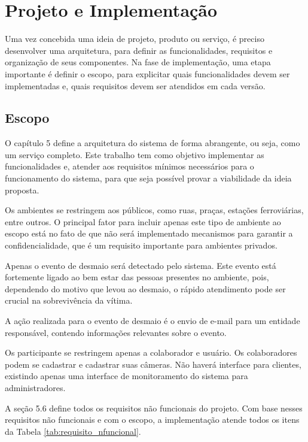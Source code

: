 \documentclass[]{politex}
\begin{document}
\chapter{Projeto e Implementação}
Uma vez concebida uma ideia de projeto, produto ou serviço, é preciso desenvolver uma arquitetura, para definir as funcionalidades, requisitos e organização de seus componentes. Na fase de implementação, uma etapa importante é definir o escopo, para explicitar quais funcionalidades devem ser implementadas e, quais requisitos devem ser atendidos em cada versão.

\section{Escopo}
O capítulo 5 define a arquitetura do sistema de forma abrangente, ou seja, como um serviço completo. Este trabalho tem como objetivo implementar as funcionalidades e, atender aos requisitos mínimos necessários para o funcionamento do sistema, para que seja possível provar a viabilidade da ideia proposta.

Os ambientes se restringem aos públicos, como ruas, praças, estações ferroviárias, entre outros. O principal fator para incluir apenas este tipo de ambiente ao escopo está no fato de que não será implementado mecanismos para garantir a confidencialidade, que é um requisito importante para ambientes privados.

Apenas o evento de desmaio será detectado pelo sistema. Este evento está fortemente ligado ao bem estar das pessoas presentes no ambiente, pois, dependendo do motivo que levou ao desmaio, o rápido atendimento pode ser crucial na sobrevivência da vítima.

A ação realizada para o evento de desmaio é o envio de e-mail para um entidade responsável, contendo informações relevantes sobre o evento.

Os participante se restringem apenas a colaborador e usuário. Os colaboradores podem se cadastrar e cadastrar suas câmeras. Não haverá interface para clientes, existindo apenas uma interface de monitoramento do sistema para administradores.

A seção 5.6 define todos os requisitos não funcionais do projeto. Com base nesses requisitos não funcionais e com o escopo, a implementação atende todos os itens da Tabela \ref{tab:requisito_nfuncional}.
\end{document}
